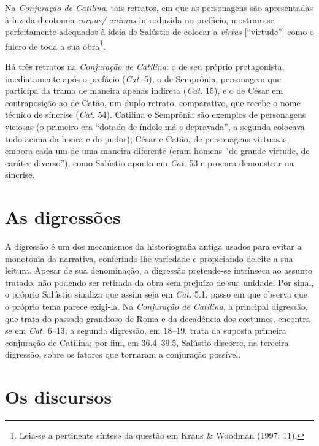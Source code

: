 Na \emph{Conjuração de Catilina}, tais retratos, em que as personagens são
apresentadas à luz da dicotomia \emph{corpus/ animus} introduzida no prefácio,
mostram-se perfeitamente adequados à ideia de Salústio de colocar a
\emph{virtus} [“virtude”] como o fulcro de toda a sua obra\footnote{Leia-se a pertinente síntese da questão em Kraus \& Woodman (1997: 11).}.  

Há três retratos na \emph{Conjuração de Catilina}: o de seu próprio
protagonista, imediatamente após o prefácio (\emph{Cat.} 5), o de Semprônia, personagem
que participa da trama de maneira apenas indireta (\emph{Cat.} 15), e o de César em
contraposição ao de Catão, um duplo retrato, comparativo, que recebe o nome
técnico de síncrise (\emph{Cat.} 54). Catilina e Semprônia são exemplos de personagens
viciosas (o primeiro era “dotado de índole má e depravada”, a segunda colocava
tudo acima da honra e do pudor); César e Catão, de personagens virtuosas,
embora cada um de uma maneira diferente (eram homens “de grande virtude, de
caráter diverso”), como Salústio aponta em \emph{Cat.} 53 e procura demonstrar na síncrise.

\section{As digressões}

A digressão é um dos mecanismos da historiografia antiga usados para evitar a
monotonia da narrativa, conferindo-lhe variedade e propiciando deleite a sua
leitura. Apesar de sua denominação, a digressão pretende-se intrínseca ao assunto tratado, não podendo ser retirada da
obra sem prejuízo de sua unidade. Por sinal, o próprio Salústio sinaliza que
assim seja em \emph{Cat.} 5.1, passo em que observa que o próprio tema parece exigi-la. Na
\emph{Conjuração de Catilina}, a principal digressão, que trata do passado
grandioso de Roma e da decadência dos costumes, encontra-se em \emph{Cat.} 6--13;
a segunda digressão, em 18--19, trata da suposta primeira conjuração de
Catilina; por fim, em 36.4--39.5, Salústio discorre, na terceira digressão,
sobre os fatores que tornaram a conjuração possível. 

\section{Os discursos}
 

